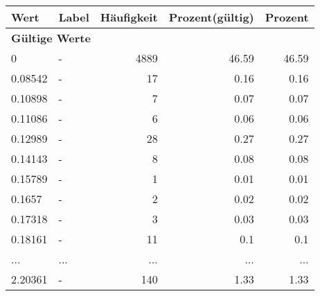      \begin{longtable}{lXrrr}
     \toprule
     \textbf{Wert} & \textbf{Label} & \textbf{Häufigkeit} & \textbf{Prozent(gültig)} & \textbf{Prozent} \\
     \endhead
     \midrule
     \multicolumn{5}{l}{\textbf{Gültige Werte}}\\
        0 & \multicolumn{1}{X}{-} & %
          \num{4889} &
          \num[round-mode=places,round-precision=2]{46,59} &
          \num[round-mode=places,round-precision=2]{46,59} \\
        0.08542 & \multicolumn{1}{X}{-} & %
          \num{17} &
          \num[round-mode=places,round-precision=2]{0,16} &
          \num[round-mode=places,round-precision=2]{0,16} \\
        0.10898 & \multicolumn{1}{X}{-} & %
          \num{7} &
          \num[round-mode=places,round-precision=2]{0,07} &
          \num[round-mode=places,round-precision=2]{0,07} \\
        0.11086 & \multicolumn{1}{X}{-} & %
          \num{6} &
          \num[round-mode=places,round-precision=2]{0,06} &
          \num[round-mode=places,round-precision=2]{0,06} \\
        0.12989 & \multicolumn{1}{X}{-} & %
          \num{28} &
          \num[round-mode=places,round-precision=2]{0,27} &
          \num[round-mode=places,round-precision=2]{0,27} \\
        0.14143 & \multicolumn{1}{X}{-} & %
          \num{8} &
          \num[round-mode=places,round-precision=2]{0,08} &
          \num[round-mode=places,round-precision=2]{0,08} \\
        0.15789 & \multicolumn{1}{X}{-} & %
          \num{1} &
          \num[round-mode=places,round-precision=2]{0,01} &
          \num[round-mode=places,round-precision=2]{0,01} \\
        0.1657 & \multicolumn{1}{X}{-} & %
          \num{2} &
          \num[round-mode=places,round-precision=2]{0,02} &
          \num[round-mode=places,round-precision=2]{0,02} \\
        0.17318 & \multicolumn{1}{X}{-} & %
          \num{3} &
          \num[round-mode=places,round-precision=2]{0,03} &
          \num[round-mode=places,round-precision=2]{0,03} \\
        0.18161 & \multicolumn{1}{X}{-} & %
          \num{11} &
          \num[round-mode=places,round-precision=2]{0,1} &
          \num[round-mode=places,round-precision=2]{0,1} \\
       ... & ... & ... & ... & ... \\
        2.20361 & \multicolumn{1}{X}{-} & %
          \num{140} &
          \num[round-mode=places,round-precision=2]{1,33} &
          \num[round-mode=places,round-precision=2]{1,33} \\


\end{longtable}
